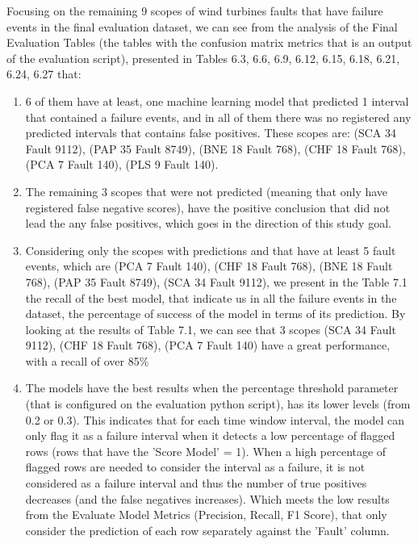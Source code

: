 Focusing on the remaining 9 scopes of wind turbines faults that have failure events in the final evaluation dataset, we can see from the analysis of the Final Evaluation Tables (the tables with the confusion matrix metrics that is an output of the evaluation script), presented in Tables 6.3, 6.6, 6.9, 6.12, 6.15, 6.18, 6.21, 6.24, 6.27 that:
\begin{enumerate}
    \item
6 of them have at least, one machine learning model that predicted 1 interval that contained a failure events, and in all of them there was no registered any predicted intervals that contains false positives.
These scopes are: (SCA 34 Fault 9112), (PAP 35 Fault 8749), (BNE 18 Fault 768), (CHF 18 Fault 768), (PCA 7 Fault 140), (PLS 9 Fault 140).
    \item
The remaining 3 scopes that were not predicted (meaning that only have registered false negative scores), have the positive conclusion that did not lead the any false positives, which goes in the direction of this study goal.
    \item
Considering only the scopes with predictions and that have at least 5 fault events, which are (PCA 7 Fault 140), (CHF 18 Fault 768), (BNE 18 Fault 768), (PAP 35 Fault 8749), (SCA 34 Fault 9112), we present in the Table 7.1 the recall of the best model, that indicate us in all the failure events in the dataset, the percentage of success of the model in terms of its prediction.
By looking at the results of Table 7.1, we can see that 3 scopes (SCA 34 Fault 9112), (CHF 18 Fault 768), (PCA 7 Fault 140) have a great performance, with a recall of over 85\%
    \item
The models have the best results when the percentage threshold parameter (that is configured on the evaluation python script), has its lower levels (from 0.2 or 0.3). This indicates that for each time window interval, the model can only flag it as a failure interval when it detects a low percentage of flagged rows (rows that have the 'Score Model' = 1). When a high percentage of flagged rows are needed to consider the interval as a failure, it is not considered as a failure interval and thus the number of true positives decreases (and the false negatives increases). 
Which meets the low results from the Evaluate Model Metrics (Precision, Recall, F1 Score), that only consider the prediction of each row separately against the 'Fault' column.
\end{enumerate}

